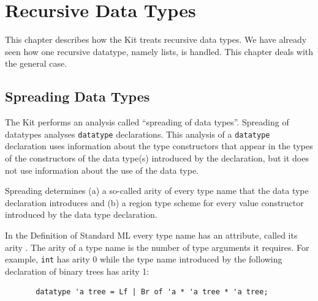 \documentclass[12pt]{book}
\begin{document}
\chapter{Recursive Data Types}
\label{datatypes.sec}
This chapter describes how the Kit treats  recursive data types. We have already
seen how one recursive datatype, namely lists, is handled. This chapter deals
with the general case.
\section{Spreading Data Types}
The Kit performs an analysis  called ``spreading of data types''.
Spreading of datatypes analyses {\tt datatype} declarations. 
This analysis of a {\tt datatype} declaration uses information
about the type constructors that appear in the types of the constructors
of the data type(s) introduced by the declaration, but it does not
use information about the use of the data type.

Spreading
determines  (a) a so-called arity of every type name
that the data type declaration introduces and (b) a region type scheme for
every value constructor introduced by the data type declaration. 

In the Definition of Standard ML every type name has an attribute, 
called its arity \cite{mthm97}. The arity of a type name is the number of
type arguments it requires. For example, {\tt int} has
arity 0 while the type name introduced by the following 
declaration of binary trees has arity 1:
\begin{verbatim}
       datatype 'a tree = Lf | Br of 'a * 'a tree * 'a tree;
\end{verbatim}
\end{document}
